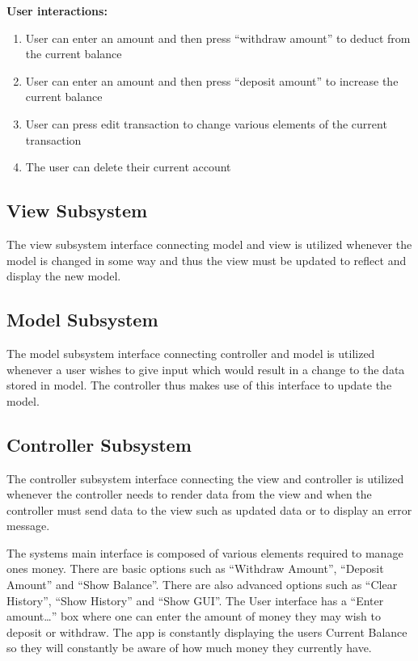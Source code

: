 \documentclass[12pt]{article}
\begin{document}
\textbf{User interactions:}\\
\vspace*{-0.2in}
\begin{enumerate}
  \item User can enter an amount and then press “withdraw amount” to deduct from the current balance
  \item User can enter an amount and then press “deposit amount” to increase the current balance
  \item User can press edit transaction to change various elements of the current transaction
  \item The user can delete their current account

\end{enumerate}


\subsection{View Subsystem}
The view subsystem interface connecting model and view is utilized whenever the model is changed in some way and thus the view must be updated to reflect and display the new model.

\subsection{Model Subsystem}
The model subsystem interface connecting controller and model is utilized whenever a user wishes to give input which would result in a change to the data stored in model. The controller thus makes use of this interface to update the model.

\subsection{Controller Subsystem}
The controller subsystem interface connecting the view and controller is utilized whenever the controller needs to render data from the view and when the controller must send data to the view such as updated data or to display an error message.

The systems main interface is composed of various elements required to manage ones money.
There are basic options such as “Withdraw Amount”, “Deposit Amount” and “Show Balance”. There are also advanced options such as “Clear History”, “Show History” and “Show GUI”. The User interface has a “Enter amount…” box where one can enter the amount of money they may wish to deposit or withdraw. The app is constantly displaying the users Current Balance so they will constantly be aware of how much money they currently have.\\
\end{document}
